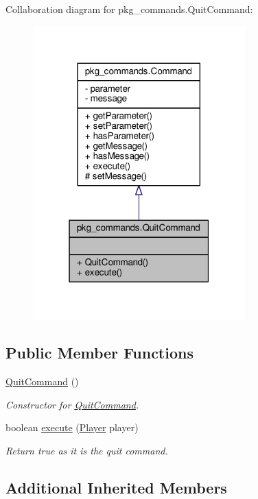 Collaboration diagram for pkg\-\_\-commands.\-Quit\-Command\-:\nopagebreak
\begin{figure}[H]
\begin{center}
\leavevmode
\includegraphics[width=232pt]{classpkg__commands_1_1QuitCommand__coll__graph}
\end{center}
\end{figure}
\subsection*{Public Member Functions}
\begin{DoxyCompactItemize}
\item 
\hyperlink{classpkg__commands_1_1QuitCommand_a92a35342caaa08998e70242e3e9997ae}{Quit\-Command} ()
\begin{DoxyCompactList}\small\item\em Constructor for \hyperlink{classpkg__commands_1_1QuitCommand}{Quit\-Command}. \end{DoxyCompactList}\item 
boolean \hyperlink{classpkg__commands_1_1QuitCommand_abdba7a2abe3df12571396448d6b9e8a6}{execute} (\hyperlink{classpkg__world_1_1Player}{Player} player)
\begin{DoxyCompactList}\small\item\em Return true as it is the quit command. \end{DoxyCompactList}\end{DoxyCompactItemize}
\subsection*{Additional Inherited Members}


